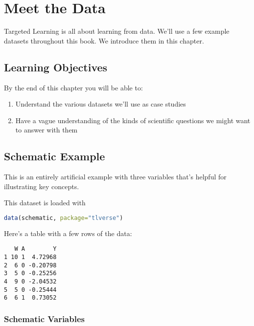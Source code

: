 \documentclass[
  12pt, krantz2,
]{krantz}
\providecommand{\tightlist}{%
  \setlength{\itemsep}{0pt}\setlength{\parskip}{0pt}}
\theoremstyle{definition}
\theoremstyle{definition}
\theoremstyle{definition}
\newcommand{\1}{\mathbbm{1}}
\begin{document}
\hypertarget{data}{%
\chapter{Meet the Data}\label{data}}

Targeted Learning is all about learning from data. We'll use a few example datasets throughout this book. We introduce them in this chapter.

\hypertarget{learning-objectives}{%
\section{Learning Objectives}\label{learning-objectives}}

By the end of this chapter you will be able to:

\begin{enumerate}
\def\labelenumi{\arabic{enumi}.}
\tightlist
\item
  Understand the various datasets we'll use as case studies
\item
  Have a vague understanding of the kinds of scientific questions we
  might want to answer with them
\end{enumerate}

\hypertarget{data-schematic}{%
\section{Schematic Example}\label{data-schematic}}

This is an entirely artificial example with three variables that's helpful for illustrating key concepts.

This dataset is loaded with

\begin{lstlisting}[language=R]
data(schematic, package="tlverse")
\end{lstlisting}

Here's a table with a few rows of the data:

\begin{lstlisting}
   W A        Y
1 10 1  4.72968
2  6 0 -0.20798
3  5 0 -0.25256
4  9 0 -2.04532
5  5 0 -0.25444
6  6 1  0.73052
\end{lstlisting}

\hypertarget{schematic-variables}{%
\subsection{Schematic Variables}\label{schematic-variables}}
\end{document}
